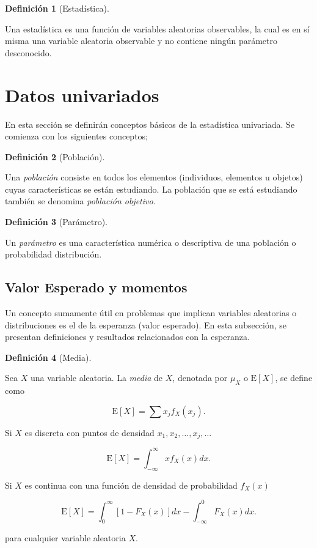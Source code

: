 \documentclass[
  us-letterpaper,
]{scrreprt}
\theoremstyle{plain}
\theoremstyle{definition}
\newtheorem{definition}{Definición}[chapter]
\theoremstyle{definition}
\theoremstyle{plain}
\theoremstyle{remark}
\begin{document}
\begin{definition}[Estadística]\protect\hypertarget{def-estad}{}\label{def-estad}

Una estadística es una función de variables aleatorias observables, la
cual es en sí misma una variable aleatoria observable y no contiene
ningún parámetro desconocido.

\end{definition}

\section{Datos univariados}\label{datos-univariados}

En esta sección se definirán conceptos básicos de la estadística
univariada. Se comienza con los siguientes conceptos;

\begin{definition}[Población]\protect\hypertarget{def-pobla}{}\label{def-pobla}

Una \emph{población} consiste en todos los elementos (individuos,
elementos u objetos) cuyas características se están estudiando. La
población que se está estudiando también se denomina \emph{población
objetivo}.

\end{definition}

\begin{definition}[Parámetro]\protect\hypertarget{def-param}{}\label{def-param}

Un \emph{parámetro} es una característica numérica o descriptiva de una
población o probabilidad distribución.

\end{definition}

\subsection{Valor Esperado y momentos}\label{valor-esperado-y-momentos}

Un concepto sumamente útil en problemas que implican variables
aleatorias o distribuciones es el de la esperanza (valor esperado). En
esta subsección, se presentan definiciones y resultados relacionados con
la esperanza.

\begin{definition}[Media]\protect\hypertarget{def-mean}{}\label{def-mean}

Sea \(X\) una variable aleatoria. La \emph{media} de \(X\), denotada por
\(\mu_X\) o \(\mathrm E[X]\), se define como

\[ \mathrm E[X]= \sum x_jf_X(x_j) .\]

Si \(X\) es discreta con puntos de densidad
\(x_1, x_2, \ldots, x_j, \ldots\)

\[ \mathrm E[X]=\int_{-\infty}^\infty x f_X(x)dx.\]

Si \(X\) es continua con una función de densidad de probabilidad
\(f_X(x)\)

\[ \mathrm E[X]=\int_0^\infty [1-F_X(x)]dx-\int_{-\infty}^0 F_X(x) dx.\]

para cualquier variable aleatoria \(X\).

\end{definition}
\end{document}
